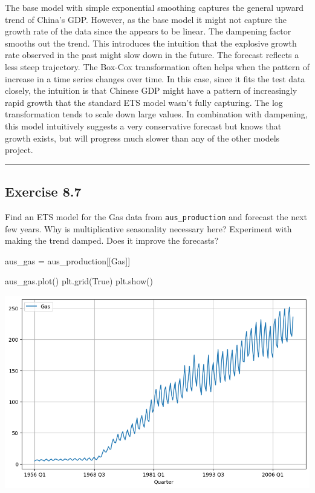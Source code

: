 \documentclass[
  11pt,
]{article}
\newenvironment{Shaded}{\begin{snugshade}}{\end{snugshade}}
\newcommand{\NormalTok}[1]{\textcolor[rgb]{0.00,0.23,0.31}{#1}}
\newcommand{\OperatorTok}[1]{\textcolor[rgb]{0.37,0.37,0.37}{#1}}
\newcommand{\StringTok}[1]{\textcolor[rgb]{0.13,0.47,0.30}{#1}}
\newcommand{\VariableTok}[1]{\textcolor[rgb]{0.07,0.07,0.07}{#1}}
\begin{document}
The base model with simple exponential smoothing captures the general
upward trend of China's GDP. However, as the base model it might not
capture the growth rate of the data since the appears to be linear. The
dampening factor smooths out the trend. This introduces the intuition
that the explosive growth rate observed in the past might slow down in
the future. The forecast reflects a less steep trajectory. The Box-Cox
transformation often helps when the pattern of increase in a time series
changes over time. In this case, since it fits the test data closely,
the intuition is that Chinese GDP might have a pattern of increasingly
rapid growth that the standard ETS model wasn't fully capturing. The log
transformation tends to scale down large values. In combination with
dampening, this model intuitively suggests a very conservative forecast
but knows that growth exists, but will progress much slower than any of
the other models project.

\begin{center}\rule{0.5\linewidth}{0.5pt}\end{center}

\subsection{Exercise 8.7}\label{exercise-8.7}

Find an ETS model for the Gas data from \texttt{aus\_production} and
forecast the next few years. Why is multiplicative seasonality necessary
here? Experiment with making the trend damped. Does it improve the
forecasts?

\begin{Shaded}
\begin{Highlighting}[]
\NormalTok{aus\_gas }\OperatorTok{=}\NormalTok{ aus\_production[[}\StringTok{\textquotesingle{}Gas\textquotesingle{}}\NormalTok{]]}
\end{Highlighting}
\end{Shaded}

\begin{Shaded}
\begin{Highlighting}[]
\NormalTok{aus\_gas.plot()}
\NormalTok{plt.grid(}\VariableTok{True}\NormalTok{)}
\NormalTok{plt.show()}
\end{Highlighting}
\end{Shaded}

\includegraphics{hw5_files/figure-pdf/cell-37-output-1.png}
\end{document}
